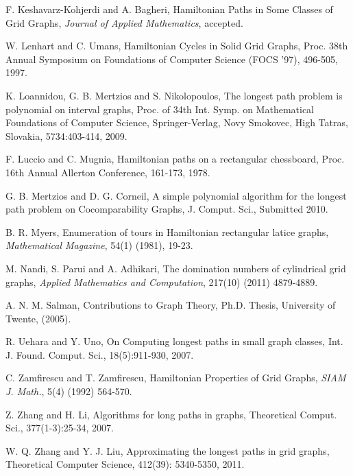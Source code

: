 \documentclass[preprint,12pt]{elsarticle}
\begin{document}
\begin{thebibliography}{00}
{F. Keshavarz-Kohjerdi and A. Bagheri, Hamiltonian Paths in Some
Classes of Grid Graphs},  {\em Journal of Applied Mathematics}, accepted.

W. Lenhart and C. Umans, Hamiltonian Cycles in Solid Grid Graphs,
Proc. 38th Annual Symposium on Foundations of Computer Science (FOCS
'97), 496-505, 1997.

K. Loannidou, G. B. Mertzios and S. Nikolopoulos, The longest path
problem is polynomial on interval graphs, Proc. of 34th Int. Symp.
on Mathematical Foundations of Computer Science, Springer-Verlag,
Novy Smokovec, High Tatras, Slovakia, 5734:403-414, 2009.

F. Luccio and C. Mugnia, Hamiltonian paths on a rectangular
chessboard, Proc. 16th Annual Allerton Conference, 161-173, 1978.

G. B. Mertzios and D. G. Corneil, A simple polynomial algorithm for
the longest path problem on Cocomparability Graphs, J. Comput. Sci.,
Submitted 2010.

{B. R. Myers, Enumeration of tours in Hamiltonian rectangular latice
graphs, \em Mathematical Magazine}, 54(1) (1981), 19-23.

{M. Nandi, S. Parui and A. Adhikari, The domination numbers of
cylindrical grid graphs, \em Applied Mathematics and Computation},
217(10) (2011) 4879-4889.

A. N. M. Salman, Contributions to Graph Theory, Ph.D. Thesis,
University of Twente, (2005).

R. Uehara and Y. Uno, On Computing longest paths in small graph
classes, Int. J. Found. Comput. Sci., 18(5):911-930, 2007.

C. Zamfirescu and T. Zamfirescu, Hamiltonian Properties of Grid
Graphs, {\em  SIAM J. Math.}, 5(4) (1992) 564-570.

Z. Zhang and H. Li, Algorithms for long paths in graphs, Theoretical
Comput. Sci., 377(1-3):25-34, 2007.

W. Q. Zhang and Y. J. Liu, Approximating the longest paths in grid
graphs, Theoretical Computer Science, 412(39): 5340-5350, 2011.

\end{thebibliography}
\end{document}
